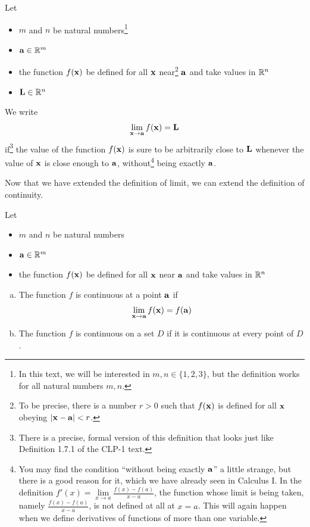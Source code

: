 \begin{defn}[Limit]\label{def limit}
Let 
\begin{itemize}\itemsep1pt \parskip0pt 
\item[$\circ$]
$m$ and $n$ be natural numbers\footnote{In this text, we will be interested in
$m,n\in\big\{1,2,3\big\}$, but the definition works for all natural
numbers $m,n$.}
\item[$\circ$]
$\mathbf{a}\in \mathbb{R}^m$
\item[$\circ$] 
the function $f(\mathbf{x})$ be defined for all $\mathbf{x}$ near\footnote{To be precise, there is a number $r>0$ such that $f(\mathbf{x})$ is defined for all $\mathbf{x}$ obeying
$|\mathbf{x}-\mathbf{a}|<r$.} $\mathbf{a}$ and take values in $\mathbb{R}^n$
\item[$\circ$]
$\mathbf{L}\in\mathbb{R}^n$
\end{itemize}
  We write
\begin{align*}
  \lim_{\mathbf{x}\to \mathbf{a}} f(\mathbf{x}) = \mathbf{L}
\end{align*}
if\footnote{There is a precise, formal version of this definition that looks just like Definition 1.7.1 of the CLP-1 text.} the value of the function $f(\mathbf{x})$ is sure to be arbitrarily close 
to $\mathbf{L}$ whenever the value of $\mathbf{x}$ is close enough to $\mathbf{a}$, 
without\footnote{You may find the condition ``without  being exactly $\mathbf{a}$'' 
a little strange, but there is a good reason for it, which we have already seen in Calculus I. In the definition 
  $f'(x) = \lim\limits_{x\rightarrow a}\frac{f(x)-f(a)}{x-a}$, 
the function whose limit is being taken, namely  $\frac{f(x)-f(a)}{x-a}$, 
is not defined at all at $x=a$. This will again happen when we define
derivatives of functions of more than one variable.} 
being exactly $\mathbf{a}$. 
\end{defn}\noindent
Now that we have extended the definition of limit, we can extend the definition 
of continuity.
\begin{defn}[Continuity]\label{def continuity}
Let 
\begin{itemize}\itemsep1pt \parskip0pt 
\item[$\circ$]
$m$ and $n$ be natural numbers
\item[$\circ$]
$\mathbf{a}\in \mathbb{R}^m$
\item[$\circ$] 
the function $f(\mathbf{x})$ be defined for all $\mathbf{x}$ near $\mathbf{a}$ and take values in $\mathbb{R}^n$
\end{itemize}
\begin{enumerate}[(a)]
\item
The function $f$ is continuous at a point $\mathbf{a}$ if
\begin{equation*}
\lim_{\mathbf{x}\to \mathbf{a}} f(\mathbf{x}) = f(\mathbf{a})
\end{equation*}
\item
The function $f$ is continuous on a set $D$ if it is continuous at
every point of $D$.
\end{enumerate} 
\end{defn}
